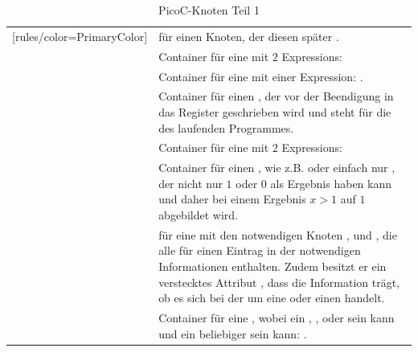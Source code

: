 \begin{table}[H]
\begin{NiceTabular}{X[7]X[10]}[rules/color=PrimaryColor]
 &  für einen Knoten, der diesen später . \\
   & Container für eine  mit $2$ Expressions: \\
   & Container für eine  mit einer Expression: . \\
   & Container für einen , der vor der Beendigung in das  Register geschrieben wird und steht für die  des laufenden Programmes. \\
   & Container für eine  mit $2$ Expressions: \\
   & Container für einen , wie z.B.  oder einfach nur , der nicht nur $1$ oder $0$ als Ergebnis haben kann und daher bei einem Ergebnis $x > 1$ auf $1$ abgebildet wird. \\
   &  für eine   mit den notwendigen Knoten ,   und  , die alle für einen Eintrag in der   notwendigen Informationen enthalten. Zudem besitzt er ein \textcolor{gray!90!black}{verstecktes Attribut}  , dass die Information trägt, ob es sich bei der  um eine  oder einen  handelt. \\
   & Container für eine , wobei  ein  , ,  oder   sein kann und   ein beliebiger  sein kann: . \\
  \bottomrule
\end{NiceTabular}
\caption{PicoC-Knoten Teil 1}
\label{tab:picoc_knoten_teil_1}
\end{table}

